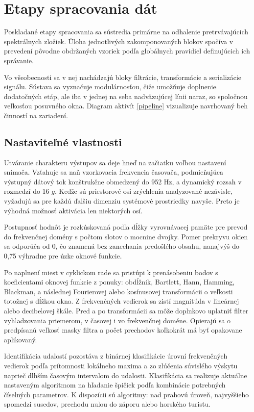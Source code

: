 \section{Etapy spracovania dát}
Poskladané etapy spracovania sa sústredia primárne na odhalenie pretrvávajúcich spektrálnych zložiek. Úloha jednotlivých
zakomponovaných blokov spočíva v prevedení pôvodne obdržaných vzoriek podľa globálnych pravidiel definujúcich ich správanie.

Vo všeobecnosti sa v nej nachádzajú bloky filtrácie, transformácie a serializácie signálu. Sústava sa
vyznačuje modulárnosťou, čiže umožňuje doplnenie dodatočných etáp, ale iba v jednej na seba nadväzujúcej
línii naraz, so spoločnou veľkosťou posuvného okna. Diagram aktivít \ref{pipeline}
vizualizuje navrhovaný beh činností na zariadení.

\subsection{Nastaviteľné vlastnosti}
Utváranie charakteru výstupov sa deje hneď na začiatku voľbou nastavení snímača.
Vzťahuje sa naň vzorkovacia frekvencia časovača, podmieňujúca výstupný dátový tok konštrukčne obmedzený do 952 Hz,
a dynamický rozsah v rozmedzí do 16 $g$. Keďže sú priestorové osi zrýchlenia analyzované nezávisle, vyžadujú sa pre každú ďalšiu
dimenziu systémové prostriedky navyše. Preto je výhodná možnosť aktivácia len niektorých osí.

Postupnosť hodnôt je rozkúskovaná podľa dĺžky vyrovnávacej pamäte pre prevod do frekvenčnej domény s počtom slotov
o mocnine dvojky. Pomer prekryvu okien sa odporúča od 0, čo znamená bez zanechania predošlého obsahu, nanajvýš
do 0,75 výhradne pre úzke oknové funkcie.

Po naplnení miest v cyklickom rade sa pristúpi k prenásobeniu bodov s koeficientami oknovej funkcie
z ponuky: obdĺžnik, Bartlett, Hann, Hamming, Blackman, a následnej Fourierovej alebo kosínusovej transformácii
o veľkosti totožnej s dĺžkou okna. Z frekvenčných vedierok sa zistí magnitúda v lineárnej alebo decibelovej škále.
Pred a po transformácii sa môže doplnkovo uplatniť filter vyhladzovania priemerom, v časovej i vo frekvenčnej doméne.
Opierajú sa o predpísanú veľkosť masky filtra a počet prechodov koľkokrát má byť opakovane aplikovaný.

Identifikácia udalostí pozostáva z binárnej klasifikácie úrovní frekvenčných vedierok podľa prítomnosti lokálneho maxima a
zo zlúčenia súvislého výskytu naprieč dlhším časovým intervalom do udalosti. Klasifikácia sa realizuje
aktuálne nastaveným algoritmom na hľadanie špičiek podľa kombinácie potrebných číselných parametrov. K dispozícii sú
algoritmy: nad prahovú úroveň, najvyššieho spomedzi susedov, prechodu nulou do záporu alebo horského turistu.

